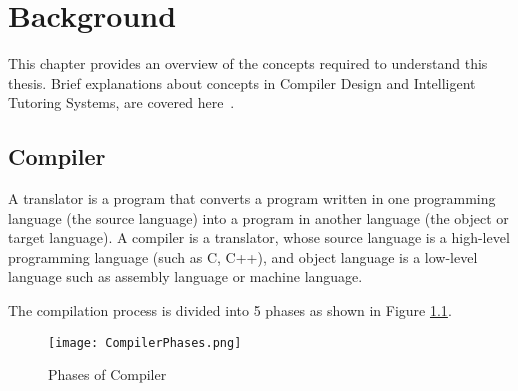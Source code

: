\chapter{Background}
\label{chap:background}
This chapter provides an overview of the concepts required to understand this thesis. Brief explanations about concepts in Compiler Design and Intelligent Tutoring Systems, are covered here~\cite{aho1977principles}.

\section{Compiler}
\label{sec:compiler}
A translator is a program that converts a program written in one programming language (the source language) into a program in another language (the object or target language). A compiler is a translator, whose source language is a high-level programming language (such as C, C++), and object language is a low-level language such as assembly language or machine language.

The compilation process is divided into 5 phases as shown in Figure \ref{fig:Compiler Phases}.
\begin{figure}
\centering
\texttt{[image: CompilerPhases.png]}
\caption{Phases of Compiler}
\label{fig:Compiler Phases}
\end{figure}

